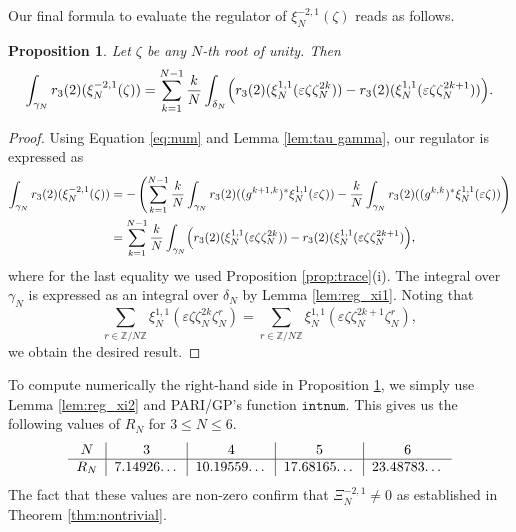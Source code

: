 \documentclass[11pt,a4,leqno]{amsart}
\theoremstyle{my theoremstyle}
\newtheorem{prop}[thm]{Proposition}
\theoremstyle{dfn}
\theoremstyle{remark}
\renewcommand{\1}{\mathbbm{1}}
\newcommand{\Z}{\mathbb{Z}}
\newcommand{\e}{\varepsilon}
\numberwithin{equation}{section}
\begin{document}
Our final formula to evaluate the regulator of $\xi_N^{-2,1}(\zeta)$ reads as follows.

\begin{prop}\label{prop:regnum}
Let $\zeta$ be any $N$-th root of unity. Then
\begin{equation*}
    \int_{\gamma_N} r_3(2)(\xi^{-2,1}_N(\zeta)) = \sum_{k=1}^{N-1} \frac{k}{N} \int_{\delta_N} \Bigl(r_3(2)(\xi_N^{1,1}(\e \zeta \zeta_N^{2k})) - r_3(2)(\xi_N^{1,1}(\e \zeta \zeta_N^{2k+1})) \Bigr).
\end{equation*}
\end{prop}

\begin{proof}
Using Equation \eqref{eq:num} and Lemma \ref{lem:tau gamma}, our regulator is expressed as
\begin{align*}
    \int_{\gamma_N} r_3(2)(\xi^{-2,1}_N(\zeta)) & = - \left(\sum_{k=1}^{N-1} \frac{k}{N} \int_{\gamma_N} r_3(2)((g^{k+1,k})^* \xi_N^{1,1}(\e \zeta)) - \frac{k}{N} \int_{\gamma_N} r_3(2)((g^{k,k})^* \xi_N^{1,1}(\e \zeta)) \right) \\
    & = \sum_{k=1}^{N-1} \frac{k}{N} \int_{\gamma_N} \Bigl(r_3(2)(\xi_N^{1,1}(\e \zeta \zeta_N^{2k})) - r_3(2)(\xi_N^{1,1}(\e \zeta \zeta_N^{2k+1}) \Bigr),
\end{align*}
where for the last equality we used Proposition \ref{prop:trace}(i). The integral over $\gamma_N$ is expressed as an integral over $\delta_N$ by Lemma \ref{lem:reg_xi1}. Noting that
\begin{equation*}
\sum_{r \in \Z/N\Z} \xi_N^{1,1}(\e \zeta \zeta_N^{2k} \zeta_N^r) = \sum_{r \in \Z/N\Z} \xi_N^{1,1}(\e \zeta \zeta_N^{2k+1} \zeta_N^r),
\end{equation*}
we obtain the desired result.
\end{proof}

To compute numerically the right-hand side in Proposition \ref{prop:regnum}, we simply use Lemma \ref{lem:reg_xi2} and PARI/GP's function $\texttt{intnum}$. This gives us the following values of $R_N$ for $3 \leqslant N \leqslant 6$.
\begin{equation}\label{table}
\begin{tabular}{ c|c|c|c|c } 
 $N$ & 3 & 4 & 5 & 6 \\ 
 \hline
 $R_N$ & 7.14926\dots & 10.19559\dots & 17.68165\dots & 23.48783\dots \\ 
\end{tabular}
\end{equation}
The fact that these values are non-zero confirm that $\Xi_N^{-2,1}\neq 0$ as established in Theorem \ref{thm:nontrivial}.
\end{document}
